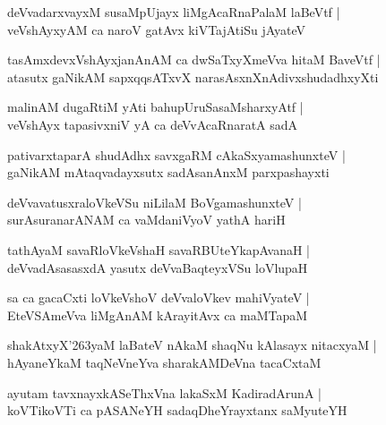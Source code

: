 \documentclass[twoside,12pt,openright]{book}
\def\S{\char'263}
\newcounter{shloka}[chapter]
\begin{document}
\begin{shloka}%
deVvadarxvayxM susaMpUjayx liMgAcaRnaPalaM laBeVtf |\\
veVshAyxyAM ca naroV gatAvx kiVTajAtiSu jAyateV 
\end{shloka}

\begin{shloka}%
tasAmxdevxVshAyxjanAnAM ca dwSaTxyXmeVva hitaM BaveVtf |\\
atasutx gaNikAM sapxqqsATxvX narasAsxnXnAdivxshudadhxyXti
\end{shloka}

\begin{shloka}%
malinAM dugaRtiM yAti bahupUruSasaMsharxyAtf |\\
veVshAyx tapasivxniV yA ca deVvAcaRnaratA sadA 
\end{shloka}

\begin{shloka}%
pativarxtaparA shudAdhx savxgaRM cAkaSxyamashunxteV |\\
gaNikAM mAtaqvadayxsutx sadAsanAnxM parxpashayxti
\end{shloka}

\begin{shloka}%
deVvavatusxraloVkeVSu niLilaM BoVgamashunxteV |\\
surAsuranarANAM ca vaMdaniVyoV yathA hariH 
\end{shloka}

\begin{shloka}%
tathAyaM savaRloVkeVshaH savaRBUteYkapAvanaH |\\
deVvadAsasasxdA yasutx deVvaBaqteyxVSu loVlupaH 
\end{shloka}

\begin{shloka}%
sa ca gacaCxti loVkeVshoV deVvaloVkev mahiVyateV |\\
EteVSAmeVva liMgAnAM kArayitAvx ca maMTapaM 
\end{shloka}

\begin{shloka}%
shakAtxyX\S yaM laBateV nAkaM shaqNu kAlasayx nitacxyaM |\\
hAyaneYkaM taqNeVneYva sharakAMDeVna tacaCxtaM 
\end{shloka}

\begin{shloka}%
ayutam tavxnayxkASeThxVna lakaSxM KadiradArunA |\\
koVTikoVTi ca pASANeYH sadaqDheYrayxtanx saMyuteYH 
\end{shloka}
\end{document}
